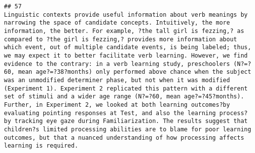 \documentclass[
  english,
  man]{apa6}
\begin{document}
\begin{verbatim}
## 57                                                                                                                                                                                                                                                                                                                                                                                                                                                                                                                                                                                                                                                                                                                                                                                                                                                                                                                                                                                                                                                                                                                                                                                                                                                                                                                                                                                                                                                                                                        Linguistic contexts provide useful information about verb meanings by narrowing the space of candidate concepts. Intuitively, the more information, the better. For example, ?the tall girl is fezzing,? as compared to ?the girl is fezzing,? provides more information about which event, out of multiple candidate events, is being labeled; thus, we may expect it to better facilitate verb learning. However, we find evidence to the contrary: in a verb learning study, preschoolers (N?=?60, mean age?=?38?months) only performed above chance when the subject was an unmodified determiner phase, but not when it was modified (Experiment 1). Experiment 2 replicated this pattern with a different set of stimuli and a wider age range (N?=?60, mean age?=?45?months). Further, in Experiment 2, we looked at both learning outcomes?by evaluating pointing responses at Test, and also the learning process?by tracking eye gaze during Familiarization. The results suggest that children?s limited processing abilities are to blame for poor learning outcomes, but that a nuanced understanding of how processing affects learning is required.

\end{verbatim}
\end{document}
